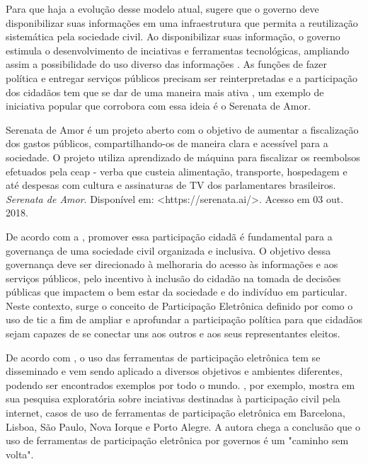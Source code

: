 \par
Para que haja a evolução desse modelo atual,  sugere que o governo deve disponibilizar suas informações em uma infraestrutura que permita a reutilização
sistemática pela sociedade civil. Ao disponibilizar suas informação, o governo estimula o desenvolvimento de inciativas e ferramentas tecnológicas, ampliando assim a possibilidade 
do uso diverso das informações \cite{zuiderwijk2012socio}. As funções de fazer política e entregar serviços públicos precisam ser reinterpretadas e a participação dos cidadãos
tem que se dar de uma maneira mais ativa \cite{bovaird2007beyond}, um exemplo de iniciativa popular que corrobora com essa ideia é o Serenata de Amor.

\par
Serenata de Amor é um projeto aberto com o objetivo de aumentar a fiscalização dos gastos públicos, compartilhando-os de maneira clara e acessível para a sociedade. O projeto utiliza
aprendizado de máquina para fiscalizar os reembolsos efetuados pela \acrfull{ceap} - verba que custeia alimentação, transporte, hospedagem e até despesas com cultura e 
assinaturas de TV dos parlamentares brasileiros. \textit{Serenata de Amor}. Disponível em: <https://serenata.ai/>. Acesso em 03 out. 2018.


\par
De acordo com a , promover essa participação cidadã é fundamental para a governança de uma sociedade civil organizada e inclusiva. O objetivo dessa governança deve
ser direcionado à melhoraria do acesso às informações e aos serviços públicos, pelo incentivo à inclusão do cidadão na tomada de decisões públicas que impactem o bem estar da 
sociedade e do indivíduo em particular.  Neste contexto, surge o conceito de Participação Eletrônica definido por  como o uso de \acrshort{tic}
a fim de ampliar e aprofundar a participação política para que cidadãos sejam capazes de se conectar uns aos outros e aos seus representantes eleitos. 

De acordo com \cite{medeiros2009novos}, o uso das ferramentas de participação eletrônica tem se disseminado e vem sendo aplicado a diversos objetivos e ambientes diferentes, podendo 
ser encontrados exemplos por todo o mundo. , por exemplo, mostra em sua pesquisa exploratória sobre inciativas destinadas à participação civil
pela internet, casos de uso de ferramentas de participação eletrônica em Barcelona, Lisboa, São Paulo, Nova Iorque e Porto Alegre. A autora chega a conclusão 
que o uso de ferramentas de participação eletrônica por governos é um "caminho sem volta".

